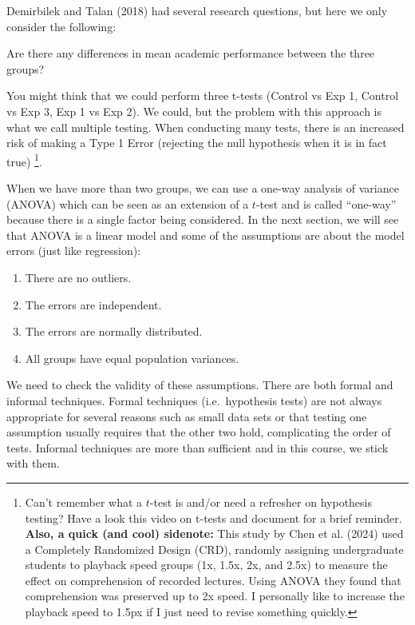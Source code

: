 \documentclass[
  letterpaper,
]{book}
\providecommand{\tightlist}{%
  \setlength{\itemsep}{0pt}\setlength{\parskip}{0pt}}\usepackage{longtable,booktabs,array}
\begin{document}
Demirbilek and Talan (2018) had several research questions, but here we
only consider the following:

Are there any differences in mean academic performance between the three
groups?

You might think that we could perform three t-tests (Control vs Exp 1,
Control vs Exp 3, Exp 1 vs Exp 2). We could, but the problem with this
approach is what we call multiple testing. When conducting many tests,
there is an increased risk of making a Type 1 Error (rejecting the null
hypothesis when it is in fact true) \footnote{Can't remember what a
  \(t\)-test is and/or need a refresher on hypothesis testing? Have a
  look this video on t-tests and document for a brief reminder.
  \textbf{Also, a quick (and cool) sidenote:} This study by Chen et al.
  (2024) used a Completely Randomized Design (CRD), randomly assigning
  undergraduate students to playback speed groups (1x, 1.5x, 2x, and
  2.5x) to measure the effect on comprehension of recorded lectures.
  Using ANOVA they found that comprehension was preserved up to 2x
  speed. I personally like to increase the playback speed to 1.5px if I
  just need to revise something quickly.}.

When we have more than two groups, we can use a one-way analysis of
variance (ANOVA) which can be seen as an extension of a \(t\)-test and
is called ``one-way'' because there is a single factor being considered.
In the next section, we will see that ANOVA is a linear model and some
of the assumptions are about the model errors (just like regression):

\begin{enumerate}
\def\labelenumi{\arabic{enumi}.}
\tightlist
\item
  There are no outliers.
\item
  The errors are independent.
\item
  The errors are normally distributed.
\item
  All groups have equal population variances.
\end{enumerate}

We need to check the validity of these assumptions. There are both
formal and informal techniques. Formal techniques (i.e.~hypothesis
tests) are not always appropriate for several reasons such as small data
sets or that testing one assumption usually requires that the other two
hold, complicating the order of tests. Informal techniques are more than
sufficient and in this course, we stick with them.
\end{document}
